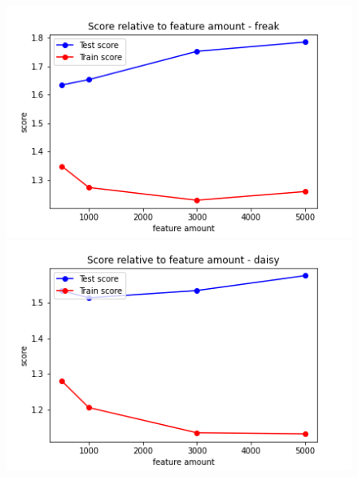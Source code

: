 \begin{figure}[H]
  \centering
  \begin{minipage}[b]{0.4\textwidth}
    \includegraphics[width=\textwidth]{images/2-LBM-feature_amount_freak_large_values.png}
  \end{minipage}
  \hfill
  \begin{minipage}[b]{0.4\textwidth}
    \includegraphics[width=\textwidth]{images/2-LBM-feature_amount_daisy_large_values.png}
  \end{minipage}
\end{figure}

